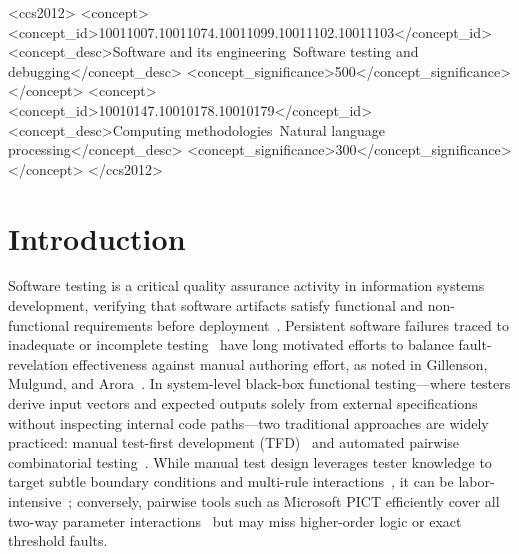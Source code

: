 \documentclass[acmsmall]{acmart}
\begin{document}
\begin{CCSXML}
<ccs2012>
 <concept>
  <concept_id>10011007.10011074.10011099.10011102.10011103</concept_id>
  <concept_desc>Software and its engineering~Software testing and debugging</concept_desc>
  <concept_significance>500</concept_significance>
 </concept>
 <concept>
  <concept_id>10010147.10010178.10010179</concept_id>
  <concept_desc>Computing methodologies~Natural language processing</concept_desc>
  <concept_significance>300</concept_significance>
 </concept>
</ccs2012>
\end{CCSXML}



\maketitle

\section{Introduction}
\label{sec:intro}

Software testing is a critical quality assurance activity in information systems development, verifying that software artifacts satisfy functional and non-functional requirements before deployment~\cite{Burnstein2003, Myers2004, Bertolino2007}. Persistent software failures traced to inadequate or incomplete testing~\cite{EwusiMensah2003} have long motivated efforts to balance fault-revelation effectiveness against manual authoring effort, as noted in Gillenson, Mulgund, and Arora~\cite{Gillenson2026}. In system-level black-box functional testing---where testers derive input vectors and expected outputs solely from external specifications without inspecting internal code paths---two traditional approaches are widely practiced: manual test-first development (TFD)~\cite{Beck2003} and automated pairwise combinatorial testing~\cite{Cohen1997, Kuhn2004, Czerwonka2008}. While manual test design leverages tester knowledge to target subtle boundary conditions and multi-rule interactions~\cite{Itkonen2013}, it can be labor-intensive~\cite{Gillenson2026}; conversely, pairwise tools such as Microsoft PICT efficiently cover all two-way parameter interactions~\cite{Nie2011} but may miss higher-order logic or exact threshold faults.
\end{document}
